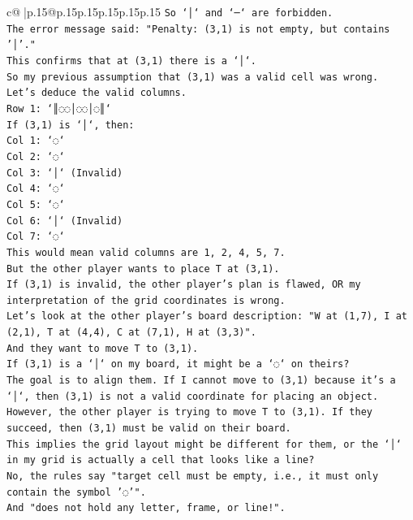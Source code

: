 \documentclass{article}
\begin{document}
{\begin{supertabular}{c@{$\;$}|p{.15\linewidth}@{}p{.15\linewidth}p{.15\linewidth}p{.15\linewidth}p{.15\linewidth}p{.15\linewidth}}
{{{\texttt{So `│` and `─` are forbidden.} \\
\texttt{The error message said: "Penalty: (3,1) is not empty, but contains '│'."} \\
\texttt{This confirms that at (3,1) there is a `│`.} \\
\texttt{So my previous assumption that (3,1) was a valid cell was wrong.} \\
\texttt{Let's deduce the valid columns.} \\
\texttt{Row 1: `║◌◌│◌◌│◌║`} \\
\texttt{If (3,1) is `│`, then:} \\
\texttt{Col 1: `◌`} \\
\texttt{Col 2: `◌`} \\
\texttt{Col 3: `│` (Invalid)} \\
\texttt{Col 4: `◌`} \\
\texttt{Col 5: `◌`} \\
\texttt{Col 6: `│` (Invalid)} \\
\texttt{Col 7: `◌`} \\
\texttt{This would mean valid columns are 1, 2, 4, 5, 7.} \\
\texttt{But the other player wants to place T at (3,1).} \\
\texttt{If (3,1) is invalid, the other player's plan is flawed, OR my interpretation of the grid coordinates is wrong.} \\
\texttt{Let's look at the other player's board description: "W at (1,7), I at (2,1), T at (4,4), C at (7,1), H at (3,3)".} \\
\texttt{And they want to move T to (3,1).} \\
\texttt{If (3,1) is a `│` on my board, it might be a `◌` on theirs?} \\
\texttt{The goal is to align them. If I cannot move to (3,1) because it's a `│`, then (3,1) is not a valid coordinate for placing an object.} \\
\texttt{However, the other player is trying to move T to (3,1). If they succeed, then (3,1) must be valid on their board.} \\
\texttt{This implies the grid layout might be different for them, or the `│` in my grid is actually a cell that looks like a line?} \\
\texttt{No, the rules say "target cell must be empty, i.e., it must only contain the symbol '◌'".} \\
\texttt{And "does not hold any letter, frame, or line!".} \\
}}}
\end{supertabular}}
\end{document}
